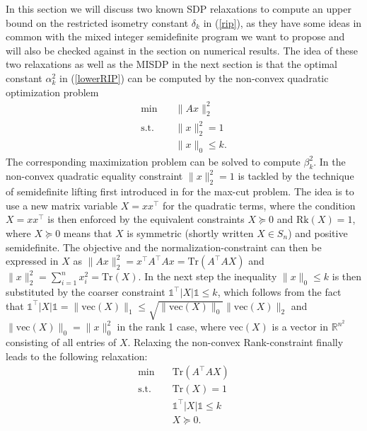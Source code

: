 \documentclass[journal]{IEEEtran}
\newcommand{\abs}[1]{\lvert{#1}\rvert}
\newcommand{\Norm}[2]{\lVert{#1}\rVert_{#2}}
\newcommand{\T}{^{\top}}
\newcommand{\Tr}{\text{Tr}}
\newcommand{\Rk}{\text{Rk}}
\newcommand{\vect}{\text{vec}}
\newcommand{\R}{\mathds{R}}
\newcommand{\ones}{\mathds{1}}
\begin{document}
In this section we will discuss two known SDP relaxations to compute an upper bound on the restricted isometry constant $\delta_k$ in (\ref{rip}), as they have some ideas in common with the mixed integer semidefinite program we want to 
propose and will also be checked against in the section on numerical results. The idea of these two relaxations as well as the MISDP in the next section is that the optimal constant $\alpha_k^2$ in (\ref{lowerRIP}) can be computed
by the non-convex quadratic optimization problem
\begin{align}\label{QP}
 \min \quad & \Norm{Ax}{2}^2 \nonumber \\
 \text{s.t.} \quad & \Norm{x}{2}^2 = 1 \tag{QP} \\
 & \Norm{x}{0} \leq k. \nonumber
\end{align}
The corresponding maximization problem can be solved to compute $\beta_k^2$. In \cite{Asp07} the non-convex quadratic equality constraint $\Norm{x}{2}^2 = 1$ is tackled by the technique of semidefinite lifting first introduced in \cite{GW95} 
for the max-cut problem. The idea is to use a new matrix variable $X=xx\T$ for the quadratic terms, where the condition $X=xx\T$ is then enforced by the equivalent constraints $X \succeq 0$ and $\Rk(X) = 1$, where 
$X \succeq 0$ means that $X$ is symmetric (shortly written \mbox{$X \in S_n$}) and positive semidefinite. The objective and the normalization-constraint can then be expressed in $X$ as  $\Norm{Ax}{2}^2 = x\T A\T Ax =
\Tr(A\T A X)$ and $\Norm{x}{2}^2 = \sum_{i=1}^n x_i^2 = \Tr(X)$. In the
next step the inequality $\Norm{x}{0} \leq k$ is then substituted by the coarser constraint $\ones\T
\abs{X} \ones \leq k$, which follows from the fact that $\ones\T\abs{X} \ones = \Norm{\vect(X)}{1}\leq \sqrt{\Norm{\vect(X)}{0}} \Norm{\vect(X)}{2}$ and $\Norm{\vect(X)}{0}=\Norm{x}{0}^2$ in the rank 1 case, where $\vect(X)$ is a vector
in $\R^{n^2}$ consisting of all entries of $X$. 
Relaxing the non-convex Rank-constraint finally leads to the following relaxation:
\begin{align}\label{Asp07}
 \min \quad & \Tr(A\T A X) \nonumber \\
 \text{s.t.} \quad & \Tr(X) = 1 \nonumber \\
 & \ones\T \abs{X} \ones \leq k \tag{A1} \\
 & X \succeq 0. \nonumber
\end{align}
\end{document}
